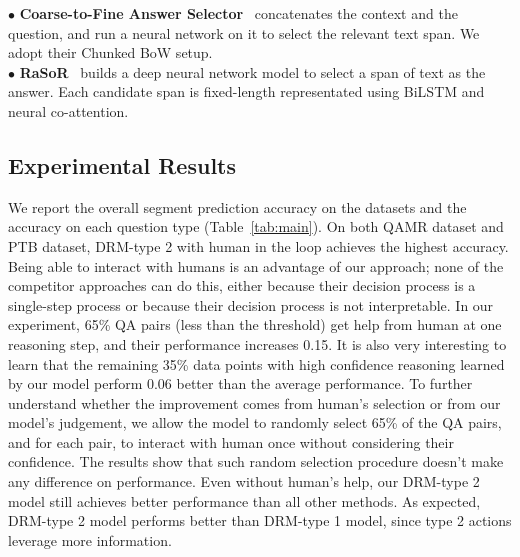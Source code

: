 $\bullet$  \textbf{Coarse-to-Fine Answer Selector}~\cite{DBLP:conf/acl/ChoiHUPLB17} concatenates the context and the question, and run a neural network on it to select the relevant text span. We adopt their Chunked BoW setup.\\
$\bullet$  \textbf{RaSoR}~\cite{DBLP:journals/corr/LeeKP016} builds a deep neural network model to select a span of text as the answer. Each candidate span is fixed-length representated using BiLSTM and neural co-attention. 

\subsection{Experimental Results}




We report the overall segment prediction accuracy on the datasets and the accuracy on each question type (Table~\ref{tab:main}). On both QAMR dataset and PTB dataset, DRM-type 2 with human in the loop achieves the highest accuracy. Being able to interact with humans is an advantage of our approach; 
none of the competitor approaches can do this, either because their decision process is a single-step process or because their decision process is not interpretable. In our experiment, 65\% QA pairs (less than the threshold) get help from human at one reasoning step, and their performance increases 0.15. It is also very interesting to learn that the remaining 35\% data points with high confidence reasoning learned by our model perform 0.06 better than the average performance. To further understand whether the improvement comes from human's selection or from our model's judgement, we allow the model to randomly select 65\% of the QA pairs, and for each pair, to interact with human once without considering their confidence. The results show that such random selection procedure doesn't make any difference on performance. Even without human's help, our DRM-type 2 model still achieves better performance than all other methods. As expected, DRM-type 2 model performs better than DRM-type 1 model, since type 2 actions leverage more information. 

